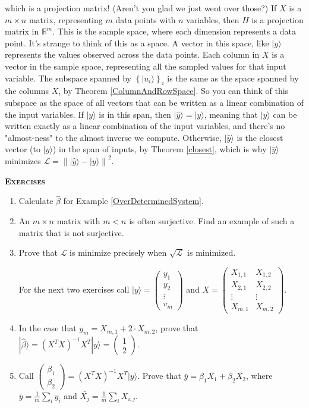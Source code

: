 \documentclass{amsbook}
\begin{document}
which is a projection matrix!  (Aren't you glad we just went over those?)  If $X$ is a $m\times n$ matrix, representing $m$ data points with $n$ variables, then $H$ is a projection matrix in $\mathbb R^m$.  This is the sample space, where each dimension represents a data point.  It's strange to think of this as a space.  A vector in this space, like $|y\rangle$ represents the values observed across the data points.  Each column in $X$ is a vector in the sample space, representing all the sampled values for that input variable.  The subspace spanned by $\left\{|u_i\rangle\right\}_i$ is the same as the space spanned by the columns $X$, by Theorem \ref{ColumnAndRowSpace}.  So you can think of this subspace as the space of all vectors that can be written as a linear combination of the input variables.  If $|y\rangle$ is in this span, then $|\hat y\rangle=|y\rangle$, meaning that $|y\rangle$ can be written exactly as a linear combination of the input variables, and there's no "almost-ness" to the almost inverse we compute.  Otherwise, $|\hat y\rangle$ is the closest vector (to $|y\rangle$) in the span of inputs, by Theorem \ref{closest}, which is why $|\hat y\rangle$ minimizes $\mathcal L=\left\| |\hat y\rangle-|y\rangle \right\|^2$.

{\bfseries\scshape\Large Exercises}

\begin{enumerate}
\item Calculate $\hat\beta$ for Example \ref{OverDeterminedSystem}.
\item An $m\times n$ matrix with $m<n$ is often surjective.  Find an example of such a matrix that is not surjective.
\item Prove that $\mathcal L$ is minimize precisely when $\sqrt{\mathcal L}$ is minimized.

For the next two exercises call $|y\rangle=\left(\begin{array}{c}y_1\\y_2\\ \vdots \\v_m\end{array}\right)$ and $X=\left(\begin{array}{cc}X_{1,1}&X_{1,2}\\X_{2,1}&X_{2,2}\\ \vdots&\vdots \\X_{m,1}&X_{m,2}\end{array}\right)$.

\item In the case that $y_m=X_{m,1}+2\cdot X_{m,2}$, prove that $|\hat\beta\rangle=\left(X^TX\right)^{-1}X^T|y\rangle=\left(\begin{array}{c}1\\2\end{array}\right)$.
\item Call $\left(\begin{array}{c}\beta_1\\ \beta_2\end{array}\right)=\left(X^TX\right)^{-1}X^T|y\rangle$.  Prove that $\bar y=\beta_1\bar{X_1}+\beta_2\bar{X_2}$, where $\bar y=\frac{1}{m}\sum_iy_i$ and $\bar{X_j}=\frac{1}{m}\sum_iX_{i,j}$.
\end{enumerate}
\end{document}
